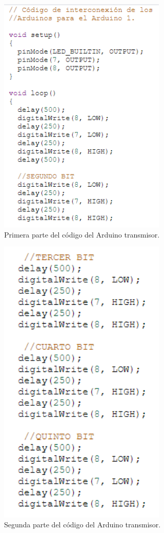 \documentclass{article}
\begin{document}
\begin{figure}[h]
\includegraphics[width=8cm]{codigo_arduino1_1.PNG}
\centering
\caption{Primera parte del código del Arduino transmisor.}
\label{fig:codigo_arduino1_1.PNG}
\end{figure}

\begin{figure}[h]
\includegraphics[width=8cm]{codigo_arduino1_2.PNG}
\centering
\caption{Segunda parte del código del Arduino transmisor.}
\label{fig:codigo_arduino1_2.PNG}
\end{figure}
\end{document}
